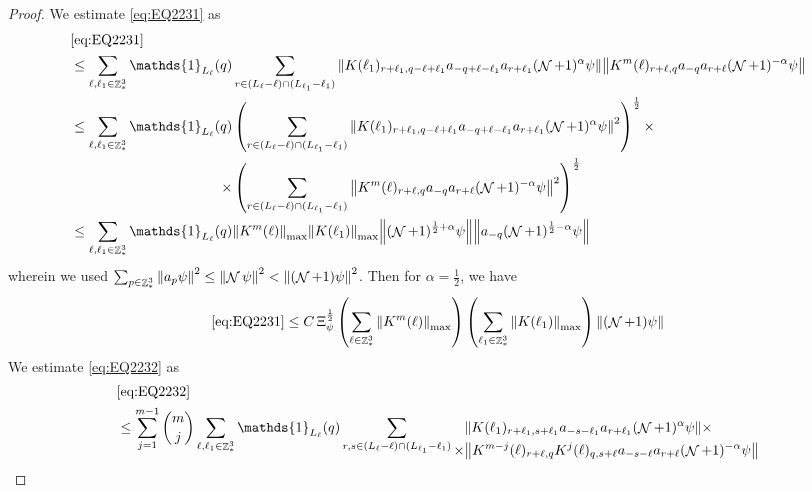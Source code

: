 \documentclass[sn-mathphys, Numbered ,a4paper]{sn-jnl}%
\DeclareMathOperator{\Z}{\mathbb{Z}}
\DeclareMathOperator{\NN}{\mathcal{N}}
\newcommand{\half}{\frac{1}{2}}
\theoremstyle{plain}
\theoremstyle{definition}
\theoremstyle{remark}
\theoremstyle{plain}
\theoremstyle{definition}
\theoremstyle{remark}
\begin{document}
{\begin{proof}
		We estimate \eqref{eq:EQ2231} as 
		\begin{align}
			&\eqref{eq:EQ2231}\nonumber\\
			&\leq \sum\limits_{\ell, \ell_1\in \Z^3_*} \mathds{1}_{L_{\ell}}(q)  \sum\limits_{r\in(L_{\ell}-\ell) \cap (L_{\ell_1}-\ell_1)} \norm{ K(\ell_1)_{r+\ell_1,q-\ell+\ell_1} a_{-q+\ell-\ell_1} a_{r+\ell_1}(\NN+1)^{\alpha}\psi}\norm{ K^m(\ell)_{r+\ell,q} a_{-q}a_{r+\ell} (\NN+1)^{-\alpha} \psi }\nonumber\\
			&\leq \sum\limits_{\ell, \ell_1\in \Z^3_*} \begin{aligned}[t] \mathds{1}_{L_{\ell}}(q)  &\left(\sum\limits_{r\in(L_{\ell}-\ell) \cap (L_{\ell_1}-\ell_1)} \norm{ K(\ell_1)_{r+\ell_1,q-\ell+\ell_1} a_{-q+\ell-\ell_1} a_{r+\ell_1} (\NN+1)^{\alpha}\psi}^2 \right)^\half \times \nonumber\\ \times &\left(\sum\limits_{r\in(L_{\ell}-\ell) \cap (L_{\ell_1}-\ell_1)} \norm{ K^m(\ell)_{r+\ell,q} a_{-q}a_{r+\ell} (\NN+1)^{-\alpha} \psi }^2\right)^\half \end{aligned}\nonumber\\
			&\leq \sum\limits_{\ell, \ell_1\in \Z^3_*} \mathds{1}_{L_{\ell}}(q)   \norm{K^m(\ell)}_{\mathrm{max}} \norm{ K(\ell_1)}_{\mathrm{max}} \norm{ (\NN+1)^{\half+\alpha}\psi}\norm{ a_{-q} (\NN+1)^{\half-\alpha} \psi }\nonumber\\
		\end{align} 
		wherein we used $\sum_{p\in \Z^3_*}\norm{a_p \psi}^2\leq\norm{\NN\psi}^2<\norm{(\NN+1)\psi}^2$. Then for $\alpha =  \half $, we have 
		\begin{equation}
			\eqref{eq:EQ2231}\leq C\, \Xi_{\psi}^\half \left(\sum\limits_{\ell\in \Z^3_*} \norm{K^m(\ell)}_{\mathrm{max}}\right)\left(  \sum\limits_{ \ell_1\in \Z^3_*}  \norm{ K(\ell_1)}_{\mathrm{max}} \right) \norm{ (\NN+1) \psi}\label{eq:estEQ2231} 
		\end{equation}  
		We estimate \eqref{eq:EQ2232} as
		\begin{align}
			&\eqref{eq:EQ2232}\nonumber\\
			&\leq \sum\limits_{j=1}^{m-1} {{m}\choose j} \sum\limits_{\ell, \ell_1\in \Z^3_*}\mathds{1}_{L_{\ell}}(q) \sum\limits_{r, s \in (L_{\ell}-\ell) \cap (L_{\ell_1}-\ell_1)} \begin{aligned}[t] &\norm{ K(\ell_1)_{r+\ell_1,s+\ell_1}a_{-s-\ell_1} a_{r+\ell_1} (\NN+1)^{\alpha}\psi}\nonumber \times \\ \times&\norm{ K^{m-j}(\ell)_{r+\ell,q} K^{j}(\ell)_{q,s+\ell} a_{-s-\ell}a_{r+\ell} (\NN+1)^{-\alpha} \psi }\end{aligned} \nonumber\\

\end{align}
\end{proof}}
\end{document}

